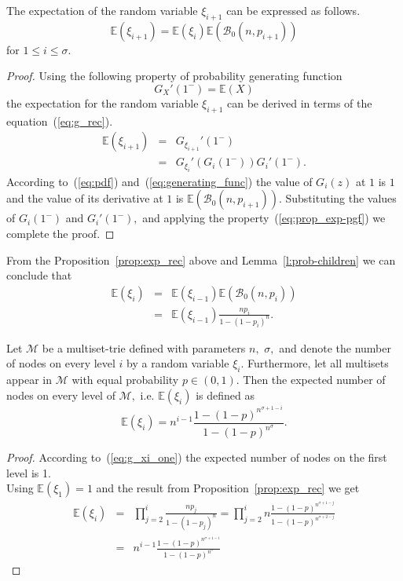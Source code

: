 \begin{proposition}\label{prop:exp_rec}
The expectation of the random variable $\xi_{i+1}$ can be expressed 
as follows.
\[
\mathbb{E}(\xi_{i+1}) = \mathbb{E}(\xi_i)\mathbb{E}(\mathcal{B}_0(n,p_{i+1}))
\]
for $1\leq i\leq\sigma.$
\end{proposition}
\begin{proof}
Using the following property of probability generating function
\begin{equation}\label{eq:prop_exp-pgf}
G_X'(1^-) = \mathbb{E}(X)
\end{equation}
the expectation for the random variable $\xi_{i+1}$ can be derived in terms of 
the equation~(\cref{eq:g_rec}).
\begin{eqnarray}\label{eq:exp}
\mathbb{E}(\xi_{i+1}) &=& G_{\xi_{i+1}}'(1^-) \nonumber \\
&=& G_{\xi_i}'(G_i(1^-))G_i'(1^-).
\end{eqnarray}
According to~(\cref{eq:pdf}) and~(\cref{eq:generating_func}) the value of $G_i(z)$ at 
$1$ is $1$ and the value of its derivative at $1$ is $\mathbb{E}(\mathcal{B}_0(n,p_{i+1})).$ 
Substituting the values of $G_i(1^-)$ and $G_i'(1^-),$ and applying the 
property~(\cref{eq:prop_exp-pgf}) we complete the proof.

\end{proof}
%
From the Proposition~\ref{prop:exp_rec} above and Lemma~\ref{l:prob-children} we 
can conclude that 
\begin{eqnarray}
\mathbb{E}(\xi_{i}) &=& \mathbb{E}(\xi_{i-1})\mathbb{E}\left( \mathcal{B}_0(n,p_{i}) \right) \nonumber \\
& = & \mathbb{E}(\xi_{i-1})\frac{np_{i}}{1-(1-p_{i})^n}.
\end{eqnarray}

\begin{theorem}\label{thm:exp_level}
Let $\mathcal{M}$ be a multiset-trie defined with parameters $n,$ $\sigma,$ and denote the number 
of nodes on every level $i$ by a random variable $\xi_i.$ Furthermore, let all multisets appear in 
$\mathcal{M}$ with equal probability $p\in (0,1).$ Then the expected number 
of nodes on every level of $\mathcal{M},$ i.e. $\mathbb{E}(\xi_i)$ is defined as 
\begin{equation}\label{eq:nodes_level}
\mathbb{E}(\xi_{i}) = n^{i-1} \frac{1-(1-p)^{n^{\sigma +1 -i}}}{1-(1-p)^{n^{\sigma}}}.
\end{equation}
\end{theorem}
\begin{proof}
According to~(\cref{eq:g_xi_one}) the expected number of nodes on the first level is 1. \\
Using $\mathbb{E}(\xi_1) = 1$ and the result from Proposition~\ref{prop:exp_rec}
we get
\begin{eqnarray*}
\mathbb{E}(\xi_{i}) &=& \prod_{j=2}^{i} \frac{n p_j}{1-(1-p_j)^n}
= \prod_{j=2}^{i} n \frac{1-(1-p)^{n^{\sigma +1-j}}}{1-(1-p)^{n^{\sigma + 2 -j}}} \\
&=& n^{i-1} \frac{1-(1-p)^{n^{\sigma +1 -i}}}{1-(1-p)^{n^{\sigma}}}
\end{eqnarray*}

\end{proof}

